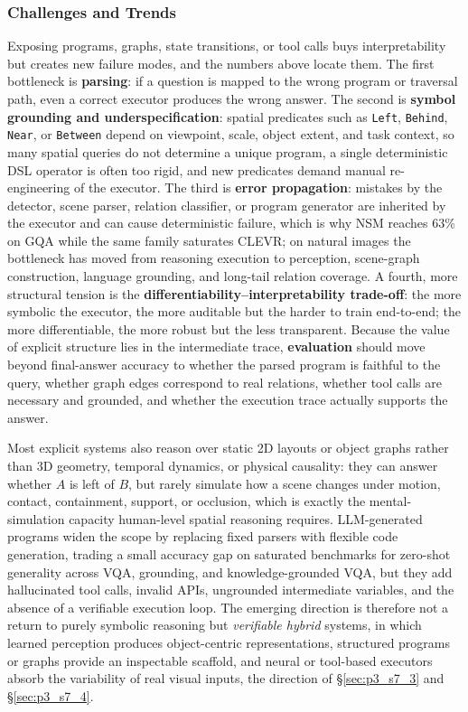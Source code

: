 \subsubsection{Challenges and Trends}
Exposing programs, graphs, state transitions, or tool calls buys interpretability but creates new failure modes, and the numbers above locate them.
The first bottleneck is \textbf{parsing}: if a question is mapped to the wrong program or traversal path, even a correct executor produces the wrong answer.
The second is \textbf{symbol grounding and underspecification}: spatial predicates such as \texttt{Left}, \texttt{Behind}, \texttt{Near}, or \texttt{Between} depend on viewpoint, scale, object extent, and task context, so many spatial queries do not determine a unique program, a single deterministic DSL operator is often too rigid, and new predicates demand manual re-engineering of the executor.
The third is \textbf{error propagation}: mistakes by the detector, scene parser, relation classifier, or program generator are inherited by the executor and can cause deterministic failure, which is why NSM reaches 63\% on GQA while the same family saturates CLEVR; on natural images the bottleneck has moved from reasoning execution to perception, scene-graph construction, language grounding, and long-tail relation coverage.
A fourth, more structural tension is the \textbf{differentiability--interpretability trade-off}: the more symbolic the executor, the more auditable but the harder to train end-to-end; the more differentiable, the more robust but the less transparent.
Because the value of explicit structure lies in the intermediate trace, \textbf{evaluation} should move beyond final-answer accuracy to whether the parsed program is faithful to the query, whether graph edges correspond to real relations, whether tool calls are necessary and grounded, and whether the execution trace actually supports the answer.

Most explicit systems also reason over static 2D layouts or object graphs rather than 3D geometry, temporal dynamics, or physical causality: they can answer whether $A$ is left of $B$, but rarely simulate how a scene changes under motion, contact, containment, support, or occlusion, which is exactly the mental-simulation capacity human-level spatial reasoning requires.
LLM-generated programs widen the scope by replacing fixed parsers with flexible code generation, trading a small accuracy gap on saturated benchmarks for zero-shot generality across VQA, grounding, and knowledge-grounded VQA, but they add hallucinated tool calls, invalid APIs, ungrounded intermediate variables, and the absence of a verifiable execution loop.
The emerging direction is therefore not a return to purely symbolic reasoning but \emph{verifiable hybrid} systems, in which learned perception produces object-centric representations, structured programs or graphs provide an inspectable scaffold, and neural or tool-based executors absorb the variability of real visual inputs, the direction of §\ref{sec:p3_s7_3} and §\ref{sec:p3_s7_4}.





